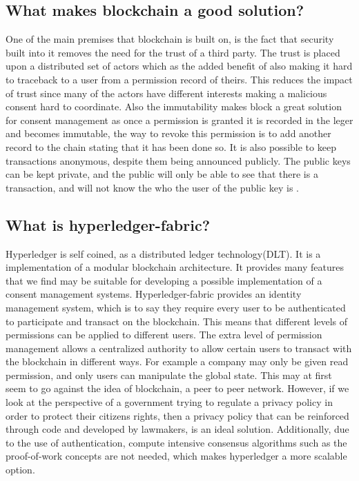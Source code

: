 \documentclass[11pt,journal]{IEEEtran}
\begin{document}
\subsection{What makes blockchain a good solution?} 
One of the main premises that blockchain is built on, is the fact that security built into it removes the need for the trust of a third party. The trust is placed upon a distributed set of actors which as the added benefit of also making it hard to traceback to a user from a permission record of theirs. This reduces the impact of trust since many of the actors have different interests making a malicious consent hard to coordinate. Also the immutability makes block a great solution for consent management as once a permission is granted it is recorded in the leger and becomes immutable, the way to revoke this permission is to add another record to the chain stating that it has been done so.  It is also possible to keep transactions anonymous, despite them being announced publicly.  The public keys can be kept private, and the public will only be able to see that there is a transaction, and will not know the who the user of the public key is \cite{nakamoto2008bitcoin}.

\subsection{What is hyperledger-fabric?}
Hyperledger is self coined, as a distributed ledger technology(DLT)\cite{WhyHyper54:online}.  It is a implementation of a modular blockchain architecture.  It provides many features that we find may be suitable for developing a possible implementation of a consent management systems.  Hyperledger-fabric provides an identity management system, which is to say they require every user to be authenticated to participate and transact on the blockchain.  This means that different levels of permissions can be applied to different users\cite{WhyHyper54:online}.  The extra level of permission management allows a centralized authority to allow certain users to transact with the blockchain in different ways.  For example a company may only be given read permission, and only users can manipulate the global state.  This may at first seem to go against the idea of blockchain, a peer to peer network.  However, if we look at the perspective of a government trying to regulate a privacy policy in order to protect their citizens rights, then a privacy policy that can be reinforced through code and developed by lawmakers, is an ideal solution. Additionally, due to the use of authentication, compute intensive consensus algorithms such as the proof-of-work concepts are not needed, which makes hyperledger a more scalable option.
\end{document}
